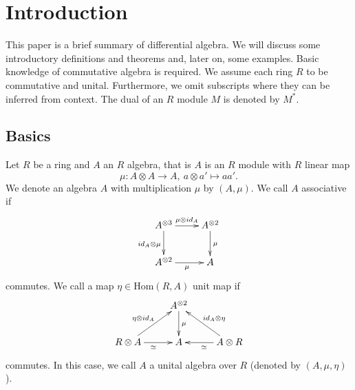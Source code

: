 \section{Introduction}
This paper is a brief summary of differential algebra. We will discuss some introductory definitions and theorems and, later on, some examples. Basic knowledge of commutative algebra is required. We assume each ring $R$ to be commutative and unital. Furthermore, we omit subscripts where they can be inferred from context. The dual of an $R$ module $M$ is denoted by $M^*$.
\subsection{Basics}
Let $R$ be a ring and $A$ an $R$ algebra, that is $A$ is an $R$ module with $R$ linear map
$$\mu : A \otimes A \longrightarrow A,\ a \otimes a' \longmapsto a a'.$$
We denote an algebra $A$ with multiplication $\mu$ by $(A, \mu)$. We call $A$ associative if
$$\xymatrix{
A^{\otimes 3} \ar[r]^{\mu \otimes id_A} \ar[d]_{id_A \otimes \mu} & A^{\otimes 2}\ar[d]^{\mu}\\
A^{\otimes 2} \ar[r]_{\mu} &A\\
}$$
commutes. We call a map $\eta \in \mathrm{Hom}(R,A)$ unit map if
$$\xymatrix{
&A^{\otimes 2}\ar[d]^\mu&\\
R \otimes A \ar[r]_{\simeq}\ar[ru]^{\eta \otimes id_A} &A&A \otimes R \ar[lu]_{id_A \otimes \eta}\ar[l]^\simeq\\
}$$
commutes. In this case, we call $A$ a unital algebra over $R$ (denoted by $(A, \mu, \eta)$).
